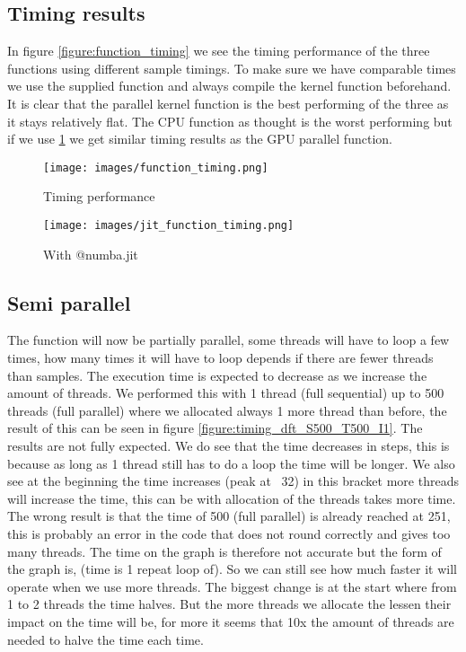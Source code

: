 \newpage

\subsection{Timing results}
\label{subsec:timing results}

In figure \ref{figure:function_timing} we see the timing performance of the three functions using different sample timings. To make sure we have comparable times we use the supplied  function and always compile the kernel function beforehand. It is clear that the parallel kernel function is the best performing of the three as it stays relatively flat.
The CPU function as thought is the worst performing but if we use  \ref{figure:jit_function_timing} we get similar timing results as the GPU parallel function.

\begin{figure}[!htb]
    \centering
    \begin{minipage}[t]{0.45\linewidth}
        \texttt{[image: images/function\_timing.png]}
        \caption{Timing performance}
        \label{figure:function_timing}
    \end{minipage}
    \begin{minipage}[t]{0.45\linewidth}
        \texttt{[image: images/jit\_function\_timing.png]}
        \caption{With @numba.jit}
        \label{figure:jit_function_timing}
    \end{minipage}
\end{figure}

\subsection{Semi parallel}
\label{subsec:semiparallel}
The function will now be partially parallel, some threads will have to loop a few times, how many times it will have to loop depends if there are fewer threads than samples. The execution time is expected to decrease as we increase the amount of threads. We performed this with 1 thread (full sequential) up to 500 threads (full parallel) where we allocated always 1 more thread than before, the result of this can be seen in figure \ref{figure:timing_dft_S500_T500_I1}.
The results are not fully expected. We do see that the time decreases in steps, this is because as long as 1 thread still has to do a loop the time will be longer. We also see at the beginning the time increases (peak at ~32) in this bracket more threads will increase the time, this can be with allocation of the threads takes more time. The wrong result is that the time of 500 (full parallel) is already reached at 251, this is probably an error in the code that does not round correctly and gives too many threads. The time on the graph is therefore not accurate but the form of the graph is, (time is 1 repeat loop of).
So we can still see how much faster it will operate when we use more threads. The biggest change is at the start where from 1 to 2 threads the time halves. But the more threads we allocate the lessen their impact on the time will be, for more it seems that 10x the amount of threads are needed to halve the time each time.


